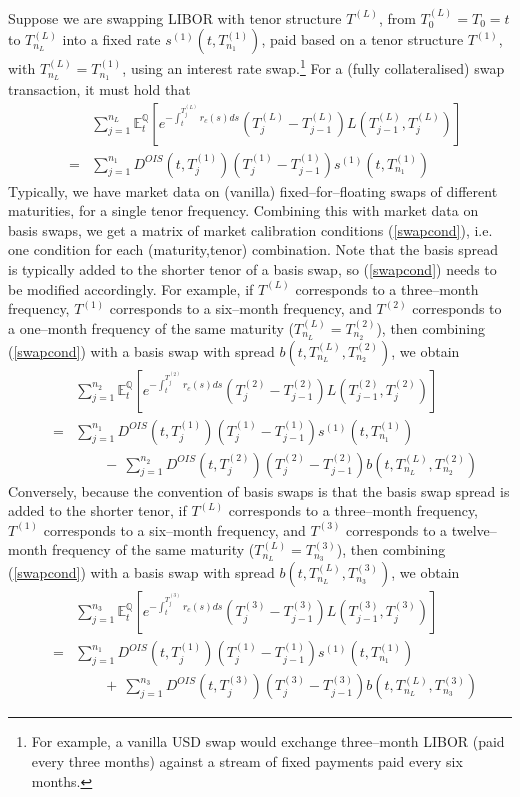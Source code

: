 \documentclass[12pt,a4paper]{article}
\theoremstyle{plain}
\numberwithin{equation}{section}
\begin{document}
Suppose we are swapping LIBOR with tenor structure $T^{(L)}$, from $T^{(L)}_0=T_0=t$ to $T^{(L)}_{n_L}$ into a fixed rate $s^{(1)}(t,T^{(1)}_{n_1})$, paid based on a tenor structure $T^{(1)}$, with $T^{(L)}_{n_L}=T^{(1)}_{n_1}$, using an interest rate swap.\footnote{For example, a vanilla USD swap would exchange three--month LIBOR (paid every three months) against a stream of fixed payments paid every six months.}
For a (fully collateralised) swap transaction, it must hold that
\begin{eqnarray}
&&\sum_{j=1}^{n_L}\mathbb{E}_t^\mathbb{Q}\left[e^{-\int_{t}^{T^{(L)}_j}r_c(s)ds}(T^{(L)}_j-T^{(L)}_{j-1})L(T^{(L)}_{j-1},T^{(L)}_j)\right]\nonumber\\
&=& \sum_{j=1}^{n_1}D^{OIS}(t,T^{(1)}_j)(T^{(1)}_j-T^{(1)}_{j-1})s^{(1)}(t,T^{(1)}_{n_1})\label{swapcond}
\end{eqnarray}
Typically, we have market data on (vanilla) fixed--for--floating swaps of different maturities, for a single tenor frequency. Combining this with market data on basis swaps, we get a matrix of market calibration conditions (\ref{swapcond}), i.e. one condition for each (maturity,tenor) combination. Note that the basis spread is typically added to the shorter tenor of a basis swap, so (\ref{swapcond}) needs to be modified accordingly. For example, if $T^{(L)}$ corresponds to a three--month frequency, $T^{(1)}$ corresponds to a six--month frequency, and $T^{(2)}$ corresponds to a one--month frequency of the same maturity ($T^{(L)}_{n_L}=T^{(2)}_{n_2}$), then combining (\ref{swapcond}) with a basis swap with spread $b(t,T^{(L)}_{n_L},T^{(2)}_{n_2})$, we obtain
\begin{eqnarray}
&&\sum_{j=1}^{n_2}\mathbb{E}_t^\mathbb{Q}\left[e^{-\int_{t}^{T^{(2)}_j}r_c(s)ds}(T^{(2)}_j-T^{(2)}_{j-1})L(T^{(2)}_{j-1},T^{(2)}_j)\right]\nonumber\\
&=& \sum_{j=1}^{n_1}D^{OIS}(t,T^{(1)}_j)(T^{(1)}_j-T^{(1)}_{j-1})s^{(1)}(t,T^{(1)}_{n_1})\nonumber\\
&&\qquad-\ \sum_{j=1}^{n_2}D^{OIS}(t,T^{(2)}_j)(T^{(2)}_j-T^{(2)}_{j-1})b(t,T^{(L)}_{n_L},T^{(2)}_{n_2})\label{basisswapcond1}
\end{eqnarray}
Conversely, because the convention of basis swaps is that the basis swap spread is added to the shorter tenor, if $T^{(L)}$ corresponds to a three--month frequency, $T^{(1)}$ corresponds to a six--month frequency, and $T^{(3)}$ corresponds to a twelve--month frequency of the same maturity ($T^{(L)}_{n_L}=T^{(3)}_{n_3}$), then combining (\ref{swapcond}) with a basis swap with spread $b(t,T^{(L)}_{n_L},T^{(3)}_{n_3})$, we obtain
\begin{eqnarray}
&&\sum_{j=1}^{n_3}\mathbb{E}_t^\mathbb{Q}\left[e^{-\int_{t}^{T^{(3)}_j}r_c(s)ds}(T^{(3)}_j-T^{(3)}_{j-1})L(T^{(3)}_{j-1},T^{(3)}_j)\right]\nonumber\\
&=& \sum_{j=1}^{n_1}D^{OIS}(t,T^{(1)}_j)(T^{(1)}_j-T^{(1)}_{j-1})s^{(1)}(t,T^{(1)}_{n_1})\nonumber\\
&&\qquad+\ \sum_{j=1}^{n_3}D^{OIS}(t,T^{(3)}_j)(T^{(3)}_j-T^{(3)}_{j-1})b(t,T^{(L)}_{n_L},T^{(3)}_{n_3})\label{basisswapcond2}
\end{eqnarray}
\end{document}
